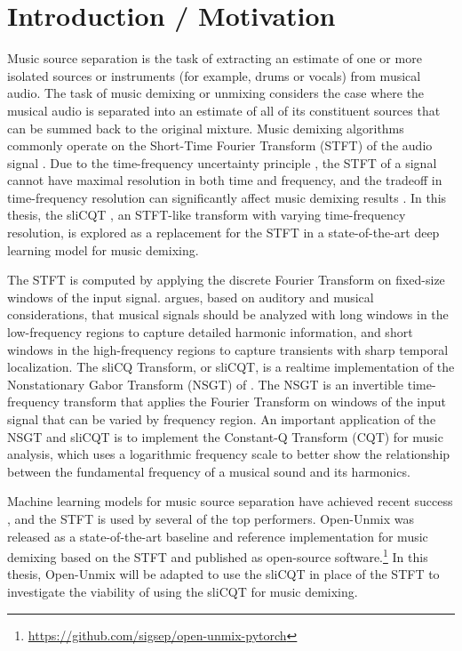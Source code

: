 \documentclass[letter,12pt]{article}
\title{\vspace{-2.25em}\ThesisTitle\vspace{-0.5em}}
\author{Sevag Hanssian}
\date{\vspace{-0.5em}December 6, 2021\vspace{-1.25em}}
\begin{document}
\maketitle

\section{Introduction / Motivation}

Music source separation is the task of extracting an estimate of one or more isolated sources or instruments (for example, drums or vocals) from musical audio. The task of music demixing or unmixing considers the case where the musical audio is separated into an estimate of all of its constituent sources that can be summed back to the original mixture. Music demixing algorithms commonly operate on the Short-Time Fourier Transform (STFT) of the audio signal \parencite{musicsepgood}. Due to the time-frequency uncertainty principle \parencite{gabor1946}, the STFT of a signal cannot have maximal resolution in both time and frequency, and the tradeoff in time-frequency resolution can significantly affect music demixing results \parencite{tftradeoff1}. In this thesis, the sliCQT \parencite{slicq}, an STFT-like transform with varying time-frequency resolution, is explored as a replacement for the STFT in a state-of-the-art deep learning model for music demixing.

The STFT is computed by applying the discrete Fourier Transform on fixed-size windows of the input signal. \textcite{doerflerphd} argues, based on auditory and musical considerations, that musical signals should be analyzed with long windows in the low-frequency regions to capture detailed harmonic information, and short windows in the high-frequency regions to capture transients with sharp temporal localization. The sliCQ Transform, or sliCQT, is a realtime implementation of the Nonstationary Gabor Transform (NSGT) of \textcite{balazs}. The NSGT is an invertible time-frequency transform that applies the Fourier Transform on windows of the input signal that can be varied by frequency region. An important application of the NSGT and sliCQT is to implement the Constant-Q Transform (CQT) \parencite{jbrown} for music analysis, which uses a logarithmic frequency scale to better show the relationship between the fundamental frequency of a musical sound and its harmonics.

Machine learning models for music source separation have achieved recent success \parencite{sisec2018}, and the STFT is used by several of the top performers. Open-Unmix \parencite{umx} was released as a state-of-the-art baseline and reference implementation for music demixing based on the STFT and published as open-source software.\footnote{\url{https://github.com/sigsep/open-unmix-pytorch}} In this thesis, Open-Unmix will be adapted to use the sliCQT in place of the STFT to investigate the viability of using the sliCQT for music demixing.
\end{document}
